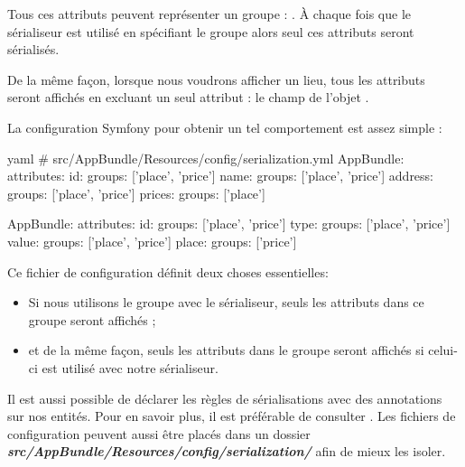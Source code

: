\documentclass[big]{zmdocument}
\begin{document}
Tous ces attributs peuvent représenter un groupe : . À chaque fois que le sérialiseur est utilisé en spécifiant le groupe  alors seul ces attributs seront sérialisés.



De la même façon, lorsque nous voudrons afficher un lieu, tous les attributs seront affichés en excluant un seul attribut : le champ  de l'objet .



La configuration Symfony pour obtenir un tel comportement est assez simple :



\begin{CodeBlock}{yaml}
# src/AppBundle/Resources/config/serialization.yml
AppBundle\Entity\Place:
    attributes:
        id:
            groups: ['place', 'price']
        name:
            groups: ['place', 'price']
        address:
            groups: ['place', 'price']
        prices:
            groups: ['place']


AppBundle\Entity\Price:
    attributes:
        id:
            groups: ['place', 'price']
        type:
            groups: ['place', 'price']
        value:
            groups: ['place', 'price']
        place:
            groups: ['price']
\end{CodeBlock}



Ce fichier de configuration définit deux choses essentielles:



\begin{itemize}
\item Si nous utilisons le groupe  avec le sérialiseur, seuls les attributs dans ce groupe seront affichés ;
\item et de la même façon, seuls les attributs dans le groupe  seront affichés si celui-ci est utilisé avec notre sérialiseur.
\end{itemize}


\begin{Information}
Il est aussi possible de déclarer les règles de sérialisations avec des annotations sur nos entités. Pour en savoir plus, il est préférable de consulter . Les fichiers de configuration peuvent aussi être placés dans un dossier \textbf{\textit{src/AppBundle/Resources/config/serialization/}} afin de mieux les isoler.
\end{Information}
\end{document}
